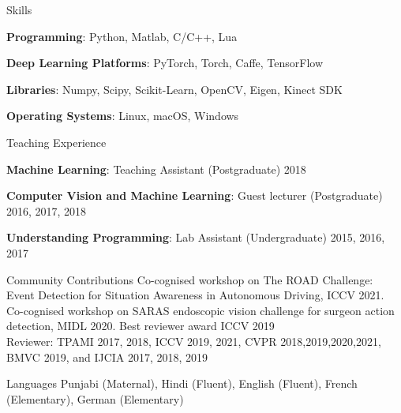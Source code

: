 \documentclass{resume} %
\begin{document}
\begin{rSection}{Skills} \itemsep -2pt
\item  \textbf{Programming}: Python, Matlab, C/C++, Lua
\item  \textbf{Deep Learning Platforms}: PyTorch, Torch, Caffe, TensorFlow
\item  \textbf{Libraries}: Numpy, Scipy, Scikit-Learn, OpenCV, Eigen, Kinect SDK
\item  \textbf{Operating Systems}: Linux, macOS, Windows
\end{rSection}

\begin{rSection}{Teaching Experience} \itemsep -2pt
  \item  \textbf{Machine Learning}: Teaching Assistant (Postgraduate) \hfill 2018
  \item  \textbf{Computer Vision and Machine Learning}: Guest lecturer (Postgraduate) \hfill 2016, 2017, 2018
  \item  \textbf{Understanding Programming}: Lab Assistant (Undergraduate)  \hfill 2015, 2016, 2017
\end{rSection}

\begin{rSection}{Community Contributions}  \itemsep -2pt
  Co-cognised workshop on The ROAD Challenge: Event Detection for Situation Awareness in Autonomous Driving, ICCV 2021.
  Co-cognised workshop on SARAS endoscopic vision challenge for surgeon action detection, MIDL 2020.
  Best reviewer award ICCV 2019\\
  Reviewer: TPAMI 2017, 2018, ICCV 2019, 2021, CVPR 2018,2019,2020,2021, BMVC 2019, and IJCIA 2017, 2018, 2019
\end{rSection}

\begin{rSection}{Languages}  \itemsep -2pt
  Punjabi (Maternal), Hindi (Fluent), English (Fluent), French (Elementary), German (Elementary)
\end{rSection}
\end{document}
